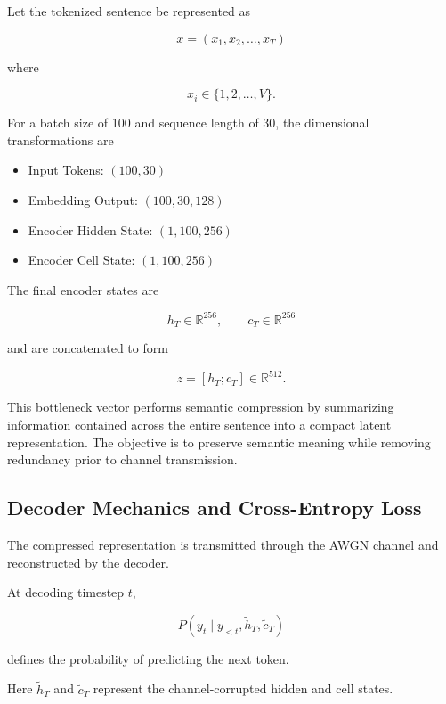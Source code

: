 \documentclass[twocolumn]{article}
\begin{document}
Let the tokenized sentence be represented as

\begin{equation}
x=(x_1,x_2,\ldots,x_T)
\end{equation}

where

\[
x_i \in \{1,2,\ldots,V\}.
\]

For a batch size of 100 and sequence length of 30, the dimensional transformations are

\begin{itemize}
    \item Input Tokens: \((100,30)\)
    \item Embedding Output: \((100,30,128)\)
    \item Encoder Hidden State: \((1,100,256)\)
    \item Encoder Cell State: \((1,100,256)\)
\end{itemize}

The final encoder states are

\begin{equation}
h_T \in \mathbb{R}^{256},
\qquad
c_T \in \mathbb{R}^{256}
\end{equation}

and are concatenated to form

\begin{equation}
z=[h_T;c_T]
\in
\mathbb{R}^{512}.
\end{equation}

This bottleneck vector performs semantic compression by summarizing information contained across the entire sentence into a compact latent representation. The objective is to preserve semantic meaning while removing redundancy prior to channel transmission.

\subsection{Decoder Mechanics and Cross-Entropy Loss}

The compressed representation is transmitted through the AWGN channel and reconstructed by the decoder.

At decoding timestep \(t\),

\begin{equation}
P(y_t \mid y_{<t},\tilde{h}_T,\tilde{c}_T)
\end{equation}

defines the probability of predicting the next token.

Here \(\tilde{h}_T\) and \(\tilde{c}_T\) represent the channel-corrupted hidden and cell states.
\end{document}
